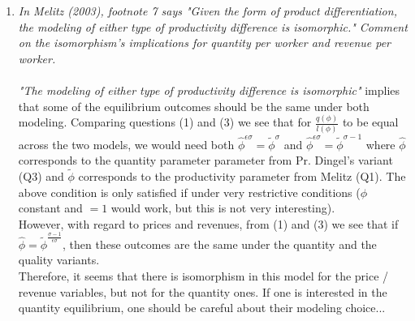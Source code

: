 \documentclass[10pt, final]{article}
\begin{document}
\begin{enumerate}[1.]
	\item \textit{In Melitz (2003), footnote 7 says "Given the form of product differentiation, the modeling of either type of productivity difference is isomorphic." Comment on the isomorphism's implications for quantity per worker and revenue per worker.}
\\
\\
\textit{"The modeling of either type of productivity difference is isomorphic"} implies that some of the equilibrium outcomes should be the same under both modeling. Comparing questions (1) and (3) we see that for $\frac{q(\phi)}{l(\phi)}$ to be equal across the two models, we would need both $\hat{\phi}^{\epsilon \sigma} = \tilde{\phi}^\sigma$ and $\hat{\phi}^{\epsilon \sigma} = \tilde{\phi}^{\sigma-1}$ where $\hat{\phi}$ corresponds to the quantity parameter parameter from Pr. Dingel's variant (Q3) and $\tilde{\phi}$ corresponds to the productivity parameter from Melitz (Q1).
The above condition is only satisfied if under very restrictive conditions ($\phi$ constant and $=1$ would work, but this is not very interesting). 
\\
However, with regard to prices and revenues, from (1) and (3) we see that if $\hat{\phi} = \tilde{\phi}^{\frac{\sigma-1}{\epsilon \sigma}}$, then these outcomes are the same under the quantity and the quality variants. 
\\
Therefore, it seems that there is isomorphism in this model for the price / revenue variables, but not for the quantity ones. If one is interested in the quantity equilibrium, one should be careful about their modeling choice...
\end{enumerate}
\end{document}
